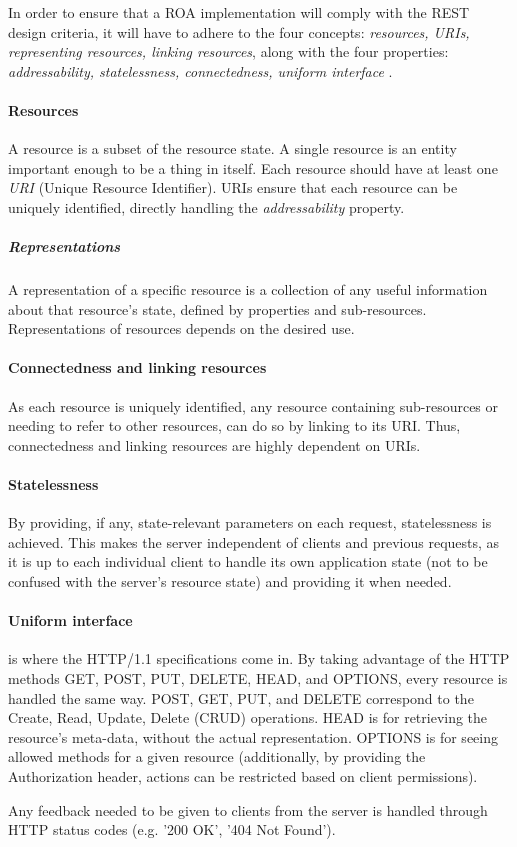 In order to ensure that a ROA implementation will comply with the REST design criteria, it will have to adhere to the four concepts: \textit{resources, URIs, representing resources, linking resources}, along with the four properties: \textit{addressability, statelessness, connectedness, uniform interface} \cite[Chapter 4]{restful_web_services}.

\paragraph{Resources} A resource is a subset of the resource state.
A single resource is an entity important enough to be a thing in itself.
Each resource should have at least one \textit{URI} (Unique Resource Identifier).
URIs ensure that each resource can be uniquely identified, directly handling the \textit{addressability} property.

\subparagraph{Representations} A representation of a specific resource is a collection of any useful information about that resource's state, defined by properties and sub-resources.
Representations of resources depends on the desired use.


\paragraph{Connectedness and linking resources} As each resource is uniquely identified, any resource containing sub-resources or needing to refer to other resources, can do so by linking to its URI.
Thus, connectedness and linking resources are highly dependent on URIs.

\paragraph{Statelessness} By providing, if any, state-relevant parameters on each request, statelessness is achieved.
This makes the server independent of clients and previous requests, as it is up to each individual client to handle its own application state (not to be confused with the server's resource state) and providing it when needed.

\paragraph{Uniform interface} is where the HTTP/1.1 specifications come in.
By taking advantage of the HTTP methods GET, POST, PUT, DELETE, HEAD, and OPTIONS, every resource is handled the same way.
POST, GET, PUT, and DELETE correspond to the Create, Read, Update, Delete (CRUD) operations.
HEAD is for retrieving the resource's meta-data, without the actual representation.
OPTIONS is for seeing allowed methods for a given resource (additionally, by providing the Authorization header, actions can be restricted based on client permissions).

Any feedback needed to be given to clients from the server is handled through HTTP status codes (e.g. '200 OK', '404 Not Found').
